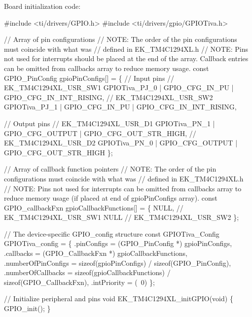 Board initialization code\+: 
\begin{DoxyCode}
\textcolor{preprocessor}{#include <ti/drivers/GPIO.h>}
\textcolor{preprocessor}{#include <ti/drivers/gpio/GPIOTiva.h>}

\textcolor{comment}{// Array of pin configurations}
\textcolor{comment}{// NOTE: The order of the pin configurations must coincide with what was}
\textcolor{comment}{//       defined in EK\_TM4C1294XL.h}
\textcolor{comment}{// NOTE: Pins not used for interrupts should be placed at the end of the}
         array.  Callback entries can be omitted from callbacks array to
         reduce memory usage.
const GPIO_PinConfig gpioPinConfigs[] = \{
    \textcolor{comment}{// Input pins}
    \textcolor{comment}{// EK\_TM4C1294XL\_USR\_SW1}
    GPIOTiva_PJ_0 | GPIO_CFG_IN_PU | GPIO_CFG_IN_INT_RISING,
    \textcolor{comment}{// EK\_TM4C1294XL\_USR\_SW2}
    GPIOTiva_PJ_1 | GPIO_CFG_IN_PU | GPIO_CFG_IN_INT_RISING,

    \textcolor{comment}{// Output pins}
    \textcolor{comment}{// EK\_TM4C1294XL\_USR\_D1}
    GPIOTiva_PN_1 | GPIO_CFG_OUTPUT | GPIO_CFG_OUT_STR_HIGH,
    \textcolor{comment}{// EK\_TM4C1294XL\_USR\_D2}
    GPIOTiva_PN_0 | GPIO_CFG_OUTPUT | GPIO_CFG_OUT_STR_HIGH
\};

\textcolor{comment}{// Array of callback function pointers}
\textcolor{comment}{// NOTE: The order of the pin configurations must coincide with what was}
\textcolor{comment}{//       defined in EK\_TM4C1294XL.h}
\textcolor{comment}{// NOTE: Pins not used for interrupts can be omitted from callbacks array to}
         reduce memory usage (\textcolor{keywordflow}{if} placed at end of gpioPinConfigs array).
const GPIO\_callbackFxn gpioCallbackFunctions[] = \{
    NULL,       \textcolor{comment}{// EK\_TM4C1294XL\_USR\_SW1}
    NULL        \textcolor{comment}{// EK\_TM4C1294XL\_USR\_SW2}
\};

\textcolor{comment}{// The device-specific GPIO\_config structure}
\textcolor{keyword}{const} GPIOTiva_Config GPIOTiva\_config = \{
    .pinConfigs = (GPIO_PinConfig *) gpioPinConfigs,
    .callbacks = (GPIO_CallbackFxn *) gpioCallbackFunctions,
    .numberOfPinConfigs = \textcolor{keyword}{sizeof}(gpioPinConfigs) / \textcolor{keyword}{sizeof}(GPIO_PinConfig),
    .numberOfCallbacks = \textcolor{keyword}{sizeof}(gpioCallbackFunctions) / \textcolor{keyword}{sizeof}(GPIO_CallbackFxn),
    .intPriority = (~0)
\};

\textcolor{comment}{// Initialize peripheral and pins}
\textcolor{keywordtype}{void} EK\_TM4C1294XL\_initGPIO(\textcolor{keywordtype}{void})
\{
    GPIO_init();
\}
\end{DoxyCode}


